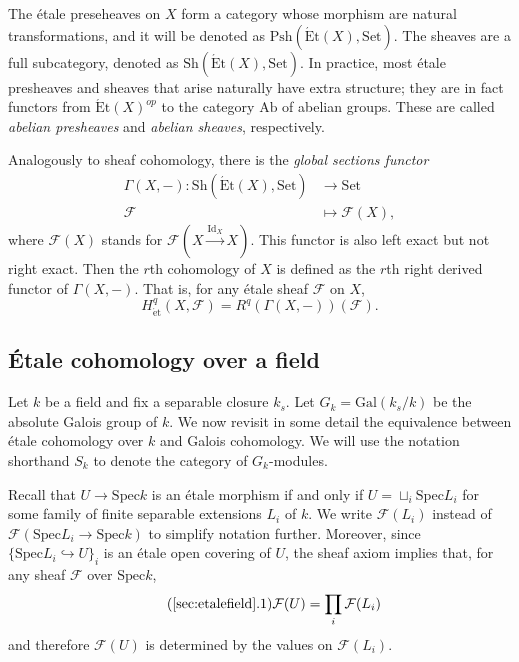 \documentclass{article}
\newcommand{\Spec}{\mathrm{Spec}}
\newcommand{\Gal}{\mathrm{Gal}}
\newcommand{\Ab}{\mathrm{Ab}}
\newcommand{\Set}{\mathrm{Set}}
\newcommand{\Et}{\acute{\mathrm{E}}\mathrm{t}}
\newcommand{\et}{\acute{\mathrm{e}}\mathrm{t}}
\newcommand{\Psh}{\mathrm{Psh}}
\newcommand{\Sh}{\mathrm{Sh}}
\newcommand{\Id}{\mathrm{Id}}
\theoremstyle{plain}
\theoremstyle{definition}
\begin{document}
    The \'{e}tale preseheaves on $X$ form a category whose morphism are natural transformations, and it will be denoted as $\Psh(\Et(X),\Set)$. The sheaves are a full subcategory, denoted as $\Sh(\Et(X),\Set)$. In practice, most \'{e}tale presheaves and sheaves that arise naturally have extra structure; they are in fact functors from $\Et(X)^{op}$ to the category $\Ab$ of abelian groups. These are called \textit{abelian presheaves} and \textit{abelian sheaves}, respectively.    

    Analogously to sheaf cohomology, there is the \textit{global sections functor}
    \begin{align*}
        \Gamma(X,-):\mathrm{Sh}(\Et(X),\Set)&\longrightarrow\Set\\
        \mathcal{F} &\longmapsto\mathcal{F} (X),
    \end{align*}
    where $\mathcal{F} (X)$ stands for $\mathcal{F} (X\xrightarrow{\Id_X}X)$. This functor is also left exact but not right exact. Then the $r$th cohomology of $X$ is defined as the $r$th right derived functor of $\Gamma(X,-)$. That is, for any \'{e}tale sheaf $\mathcal{F}$ on $X$, 
    $$H^q_{\et}(X,\mathcal{F})=R^q(\Gamma(X,-))(\mathcal{F} ).$$  


    \subsection{\'{E}tale cohomology over a field}\label{sec:etalefield}
    Let $k$ be a field and fix a separable closure $k_s$. Let $G_k=\Gal(k_s/k)$ be the absolute Galois group of $k$. We now revisit in some detail the equivalence between \'{e}tale cohomology over $k$ and Galois cohomology. We will use the notation shorthand $S_k$ to denote the category of $G_k$-modules.

    Recall that $U\to\Spec k$ is an \'{e}tale morphism if and only if $U=\sqcup_i \Spec L_i$ for some family of finite separable extensions $L_i$ of $k$. We write $\mathcal{F} (L_i)$ instead of $\mathcal{F} (\Spec L_i\to\Spec k)$ to simplify notation further. Moreover, since $\{\Spec L_i\hookrightarrow U\}_i$ is an \'{e}tale open covering of $U$, the sheaf axiom implies that, for any sheaf $\mathcal{F} $ over $\Spec k$, 
    \begin{equation}\label{eqn:speck}\tag{\ref{sec:etalefield}.1}
        \mathcal{F} (U)=\prod_i\mathcal{F} (L_i)
    \end{equation}
    and therefore $\mathcal{F} (U)$ is determined by the values on $\mathcal{F} (L_i)$. 
\end{document}
